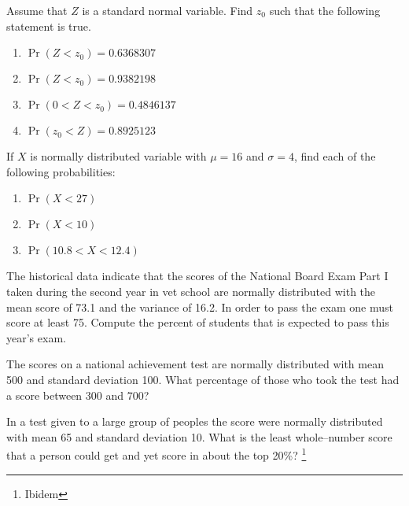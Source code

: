 \begin{problem}
  Assume that $Z$ is a standard normal variable.  Find $z_0$ such that
  the following statement is true.
  \begin{multicols}{2}
    \begin{enumerate} \renewcommand{\theenumi}{\roman{enumi}}
    \item  $\Pr(Z<z_0)=0.6368307$ %
   \item $\Pr(Z<z_0)=0.9382198$ %
   \item $\Pr(0<Z<z_0)= 0.4846137$  %
   \item $\Pr(z_0<Z)=0.8925123$ %
    \end{enumerate}
  \end{multicols}
\end{problem}

\begin{problem}
  If $X$ is normally distributed variable with $\mu=16$ and $\sigma=4$, find
  each of the following probabilities: 
  \begin{multicols}{3}
    \begin{enumerate} \renewcommand{\theenumi}{\roman{enumi}}
    \item $\Pr(X<27)$ 
    \item $\Pr(X<10)$ 
    \item $\Pr(10.8<X<12.4)$
    \end{enumerate}
  \end{multicols}
\end{problem}

\begin{problem} 
  The historical data indicate that the scores of the National Board
  Exam Part I taken during the second year in vet school are
  normally distributed with the mean score of 73.1 and the variance of
  16.2. In order to pass the exam one must score at least 75. Compute
  the percent of students that is expected to pass  this year's exam.

\end{problem}
\begin{problem}%
  The scores on a national achievement test are normally distributed
  with mean 500 and standard deviation 100. What percentage of those
  who took the test had a score between 300 and 700?
\end{problem}


\begin{problem}  %
  In a test given to a large group of peoples the score were normally
  distributed with mean 65 and standard deviation 10. What is the
  least whole--number score that a person could get and yet score in
  about the top 20\%? \footnote{Ibidem}
\end{problem}

